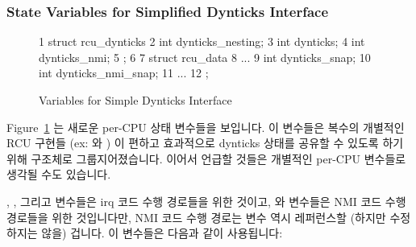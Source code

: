 \subsubsection{State Variables for Simplified Dynticks Interface}
\label{sec:formal:State Variables for Simplified Dynticks Interface}

\begin{figure}[tbp]
{ \scriptsize
\begin{verbbox}
  1 struct rcu_dynticks {
  2   int dynticks_nesting;
  3   int dynticks;
  4   int dynticks_nmi;
  5 };
  6
  7 struct rcu_data {
  8   ...
  9   int dynticks_snap;
 10   int dynticks_nmi_snap;
 11   ...
 12 };
\end{verbbox}
}
\centering
\theverbbox
\caption{Variables for Simple Dynticks Interface}
\label{fig:formal:Variables for Simple Dynticks Interface}
\end{figure}

Figure~\ref{fig:formal:Variables for Simple Dynticks Interface}
는 새로운 per-CPU 상태 변수들을 보입니다.
이 변수들은 복수의 개별적인 RCU 구현들 (ex:  와 ) 이 편하고
효과적으로 dynticks 상태를 공유할 수 있도록 하기 위해 구조체로
그룹지어졌습니다.
이어서 언급할 것들은 개별적인 per-CPU 변수들로 생각될 수도 있습니다.

, , 그리고  변수들은 irq
코드 수행 경로들을 위한 것이고,  와 
변수들은 NMI 코드 수행 경로들을 위한 것입니다만, NMI 코드 수행 경로는
 변수 역시 레퍼런스할 (하지만 수정하지는 않을) 겁니다.
이 변수들은 다음과 같이 사용됩니다:
\iffalse

Figure~\ref{fig:formal:Variables for Simple Dynticks Interface}
shows the new per-CPU state variables.
These variables are grouped into structs to allow multiple independent
RCU implementations (e.g., \co{rcu} and \co{rcu_bh}) to conveniently
and efficiently share dynticks state.
In what follows, they can be thought of as independent per-CPU variables.

The \co{dynticks_nesting}, \co{dynticks}, and \co{dynticks_snap} variables
are for the irq code paths, and the \co{dynticks_nmi} and
\co{dynticks_nmi_snap} variables are for the NMI code paths, although
the NMI code path will also reference (but not modify) the
\co{dynticks_nesting} variable.
These variables are used as follows:
\fi


